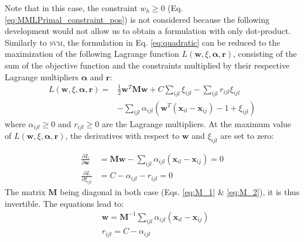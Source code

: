 
\noindent Note that in this case, the constraint $w_h \geq 0$ (Eq. \ref{eq:MMLPrimal_constraint_pos}) is not considered because the following development would not allow us to obtain a formulation with only dot-product. \\
Similarly to \textsc{svm}, the formulation in Eq. \ref{eq:quadratic} can be reduced to the maximization of the following Lagrange function $L(\textbf{w},\xi,\boldsymbol{\alpha},\textbf{r})$, consisting of the sum of the objective function and the constraints multiplied by their respective Lagrange multipliers $\boldsymbol{\alpha}$ and $\textbf{r}$:
\begin{equation}
\begin{aligned}
L(\textbf{w},\xi,\boldsymbol{\alpha},\textbf{r}) 
= & 
\frac{1}{2} \textbf{w}^T \textbf{M} \textbf{w}
+ C \sum\limits_{ijl} \xi_{ijl} - \sum\limits_{ijl}r_{ijl} \xi_{ijl} \\
&  - \sum\limits_{ijl} \alpha_{ijl}\left( \textbf{w}^T(\textbf{x}_{il}-\textbf{x}_{ij})-1+\xi_{ijl} \right)
\label{eq:OptimizationDual}
\end{aligned}
\end{equation}
\noindent where $\alpha_{ijl} \geq 0$ and $r_{ijl} \geq 0$ are the Lagrange multipliers. At the maximum value of $L(\textbf{w},\xi,\boldsymbol{\alpha},\textbf{r})$, the derivatives with respect to $\textbf{w}$ and $\xi_{ijl}$ are set to zero:

\begin{align*}
	\frac{\partial L}{\partial \textbf{w}} 
	& = 
	\textbf{M} \textbf{w} 
	- \sum\limits_{ijl} \alpha_{ijl}(\textbf{x}_{il}-\textbf{x}_{ij}) 
	= 0 \\
	\frac{\partial L}{\partial \xi_{ijl}} & = C - \alpha_{ijl} - r_{ijl} = 0
\end{align*}
\noindent The matrix $\textbf{M}$ being diagonal in both case (Eqs. \ref{eq:M_1} \& \ref{eq:M_2}), it is thus invertible. The equations lead to:
\begin{align}
	& \textbf{w} = \textbf{M}^{-1}  
	\sum\limits_{ijl} \alpha_{ijl}(\textbf{x}_{il}-\textbf{x}_{ij}) \label{Eq:eqn_w} 
	\\ 
	& r_{ijl} = C - \alpha_{ijl} \label{Eq:eqn_w2}
\end{align}

